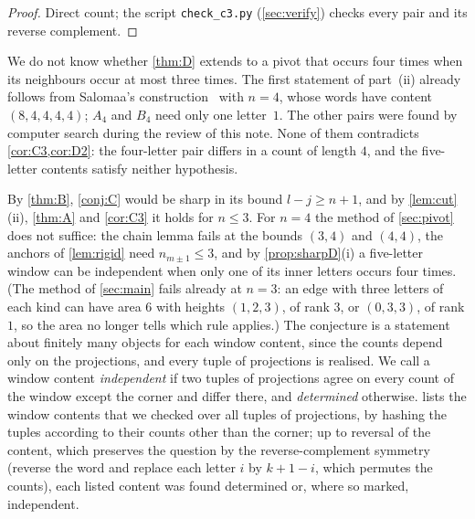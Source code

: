 \documentclass[11pt,a4paper]{article}
\begin{document}
\begin{proof}
Direct count; the script \texttt{check\_c3.py} (\cref{sec:verify}) checks every pair and its reverse complement.
\end{proof}

We do not know whether \cref{thm:D} extends to a pivot that occurs four times when its neighbours occur at most three times. The first statement of part~(ii) already follows from Salomaa's construction~\cite[Lemma~3, p.~227, and proof of Theorem~4, pp.~228--229]{Sal06} with $n=4$, whose words have content $(8,4,4,4,4)$; $A_4$ and $B_4$ need only one letter~$1$. The other pairs were found by computer search during the review of this note. None of them contradicts \cref{cor:C3,cor:D2}: the four-letter pair differs in a count of length $4$, and the five-letter contents satisfy neither hypothesis.

By \cref{thm:B}, \cref{conj:C} would be sharp in its bound $l-j\ge n+1$, and by \cref{lem:cut}(ii), \cref{thm:A} and \cref{cor:C3} it holds for $n\le3$. For $n=4$ the method of \cref{sec:pivot} does not suffice: the chain lemma fails at the bounds $(3,4)$ and $(4,4)$, the anchors of \cref{lem:rigid} need $n_{m\pm1}\le3$, and by \cref{prop:sharpD}(i) a five-letter window can be independent when only one of its inner letters occurs four times. (The method of \cref{sec:main} fails already at $n=3$: an edge with three letters of each kind can have area $6$ with heights $(1,2,3)$, of rank $3$, or $(0,3,3)$, of rank $1$, so the area no longer tells which rule applies.) The conjecture is a statement about finitely many objects for each window content, since the counts depend only on the projections, and every tuple of projections is realised. We call a window content \emph{independent} if two tuples of projections agree on every count of the window except the corner and differ there, and \emph{determined} otherwise.  lists the window contents that we checked over all tuples of projections, by hashing the tuples according to their counts other than the corner; up to reversal of the content, which preserves the question by the reverse-complement symmetry (reverse the word and replace each letter $i$ by $k+1-i$, which permutes the counts), each listed content was found determined or, where so marked, independent.
\end{document}
